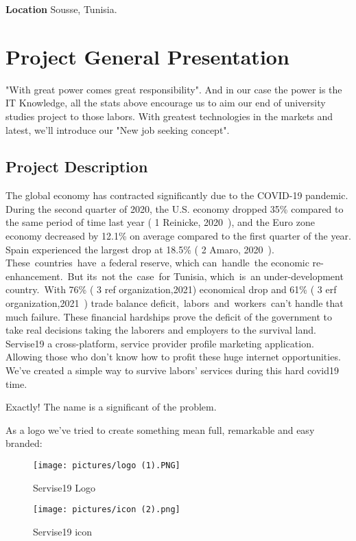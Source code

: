 \documentclass[12pt]{report}
\begin{document}
\textbf{Location} Sousse, Tunisia.



\section{Project General Presentation}
"With great power comes great responsibility".
And in our case the power is the IT Knowledge, all the stats above encourage us to aim our end of university studies project to those labors. With greatest technologies in the markets and latest, we'll introduce our "New job seeking concept".

\subsection{Project Description}
The global economy has contracted significantly due to the COVID-19 pandemic. During the second quarter of 2020, the U.S. economy dropped 35\% compared to the same period of time last year ( 1 Reinicke, 2020~\cite{one}), and the Euro zone economy decreased by 12.1\% on average compared to the first quarter of the year. Spain experienced the largest drop at 18.5\% ( 2 Amaro, 2020~\cite{two}). These countries have a federal reserve, which can handle the economic re-enhancement. But its not the case for Tunisia, which is an under-development country. With 76\% ( 3 ref organization,2021) economical drop and 61\% ( 3 erf organization,2021~\cite{three}) trade balance deficit, labors and workers can't handle that much failure.
These financial hardships prove the deficit of the government to take real decisions taking the laborers and employers to the survival land.\newline
Servise19  a cross-platform, service provider profile marketing application. Allowing those who don't know how to profit these huge internet opportunities. We've created a simple way to survive labors' services during this hard covid19 time.\newline

Exactly! The name is a significant of the problem.

As a logo we’ve tried to create something mean full, remarkable and easy branded:
\begin{figure}[!htbp]
    \centering
    \texttt{[image: pictures/logo (1).PNG]}
    \caption{Servise19 Logo}
    \label{fig:Servise19Logo}
\end{figure}
\pagebreak
\begin{figure}[!htbp]
    \centering
    \texttt{[image: pictures/icon (2).png]}
    \caption{Servise19 icon}
    \label{fig:Servise19icon}
\end{figure}
\end{document}
